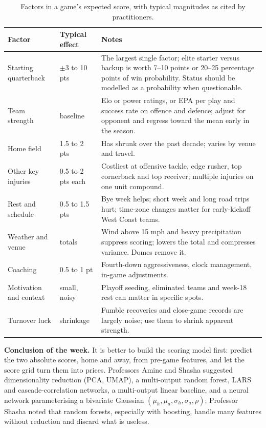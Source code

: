 \begin{table}[H]
\centering
\small
\begin{tabular}{p{3cm}p{2.4cm}p{8.4cm}}
\toprule
\textbf{Factor} & \textbf{Typical effect} & \textbf{Notes} \\
\midrule
Starting quarterback & $\pm$3 to 10 pts & The largest single factor; elite starter versus backup is worth 7--10 points or 20--25 percentage points of win probability. Status should be modelled as a probability when questionable. \\
Team strength & baseline & Elo or power ratings, or EPA per play and success rate on offence and defence; adjust for opponent and regress toward the mean early in the season. \\
Home field & 1.5 to 2 pts & Has shrunk over the past decade; varies by venue and travel. \\
Other key injuries & 0.5 to 2 pts each & Costliest at offensive tackle, edge rusher, top cornerback and top receiver; multiple injuries on one unit compound. \\
Rest and schedule & 0.5 to 1.5 pts & Bye week helps; short week and long road trips hurt; time-zone changes matter for early-kickoff West Coast teams. \\
Weather and venue & totals & Wind above 15 mph and heavy precipitation suppress scoring; lowers the total and compresses variance. Domes remove it. \\
Coaching & 0.5 to 1 pt & Fourth-down aggressiveness, clock management, in-game adjustments. \\
Motivation and context & small, noisy & Playoff seeding, eliminated teams and week-18 rest can matter in specific spots. \\
Turnover luck & shrinkage & Fumble recoveries and close-game records are largely noise; use them to shrink apparent strength. \\
\bottomrule
\end{tabular}
\caption{Factors in a game's expected score, with typical magnitudes as cited by practitioners.}
\label{tab:factors}
\end{table}

\textbf{Conclusion of the week.} It is better to build the scoring model first: predict the two absolute scores, home and away, from pre-game features, and let the score grid turn them into prices. Professors Amine and Shasha suggested dimensionality reduction (PCA, UMAP), a multi-output random forest, LARS and cascade-correlation networks, a multi-output linear baseline, and a neural network parameterising a bivariate Gaussian $(\mu_h,\mu_a,\sigma_h,\sigma_a,\rho)$; Professor Shasha noted that random forests, especially with boosting, handle many features without reduction and discard what is useless.
